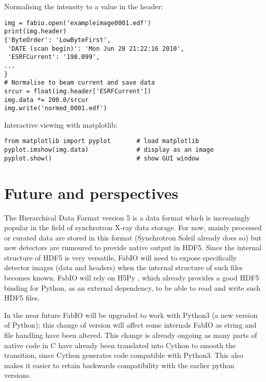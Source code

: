 \documentclass[preprint ]{iucr}
\begin{document}
Normalising the intensity to a value in the header:\\
\begin{verbatim}
img = fabio.open('exampleimage0001.edf')
print(img.header)
{'ByteOrder': 'LowByteFirst',
 'DATE (scan begin)': 'Mon Jun 28 21:22:16 2010',
 'ESRFCurrent': '198.099',
...
}
# Normalise to beam current and save data
srcur = float(img.header['ESRFCurrent'])
img.data *= 200.0/srcur
img.write('normed_0001.edf')
\end{verbatim}

Interactive viewing with matplotlib:\\
\begin{verbatim}
from matplotlib import pyplot       # load matplotlib 
pyplot.imshow(img.data)             # display as an image
pyplot.show()                       # show GUI window
\end{verbatim}


\section{Future and perspectives}
The Hierarchical Data Format version 5 \cite{hdf5} is a data format which is
increasingly popular in the field of synchrotron X-ray data storage.
For now, mainly processed or curated data are stored in this format (Synchrotron
Soleil \cite{tub05} already does so) but new detectors are
rumoured to provide native output in HDF5.
Since the internal structure of HDF5 is very versatile, FabIO will need to expose 
specifically detector images (data and headers) when the internal structure 
of such files becomes known. FabIO will rely on H5Py \cite{h5py}, which already
provides a good HDF5 binding for Python, as an external dependency, to be able
to read and write such HDF5 files.

In the near future FabIO will be upgraded to work with Python3 (a new version of 
Python); this change of version will affect some internals FabIO as string and 
file handling have been altered.
This change is already ongoing as many parts of native code in C have already
been translated into Cython \cite{cython} to smooth the transition, since 
Cython generates code compatible with Python3. 
This also makes it easier to retain backwards compatibility with the earlier
python versions. %
\end{document}
